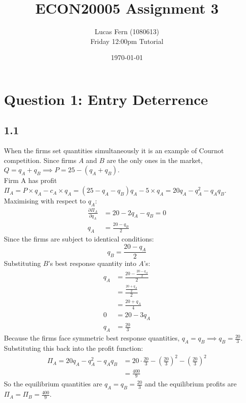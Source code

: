 \documentclass{article}
\title{\vspace{-2cm}ECON20005 Assignment 3}
\date{\today}
\author{Lucas Fern (1080613)\\Friday 12:00pm Tutorial}
\begin{document}
\maketitle
\section*{Question 1: Entry Deterrence}
\subsection*{1.1}
When the firms set quantities simultaneously it is an example of Cournot competition. Since firms $A$ and $B$ are the only ones in the market, $Q = q_{A} + q_{B} \implies P = 25 - (q_{A} + q_{B})$.\\[2mm]
Firm A has profit $\Pi_{A} = P \times q_{A} - c_{A} \times q_{A} = (25 - q_{A} - q_{B}) q_{A} - 5 \times q_{A} = 20q_{A} - q_{A}^{2} - q_{A}q_{B}$.\\[2mm]
Maximising with respect to $q_{A}$:
\begin{align*}
    \frac{\partial \Pi_{A}}{\partial q_{A}} &= 20 - 2q_{A} - q_{B} = 0\\
    q_{A} &= \frac{20 - q_{B}}{2}
\end{align*}
Since the firms are subject to identical conditions:
$$q_{B} = \frac{20 - q_{A}}{2}$$
Substituting $B$'s best response quantity into $A$'s:
\begin{align*}
    q_{A} &= \frac{20 - \frac{20 - q_{A}}{2}}{2}\\
    &= \frac{\frac{20 + q_{A}}{2}}{2}\\
    &= \frac{20 + q_{A}}{4}\\
    0 &= 20 - 3q_{A}\\
    q_{A} &= \frac{20}{3}
\end{align*}
Because the firms face symmetric best response quantities, $q_{A} = q_{B} \implies q_{B} = \frac{20}{3}$.
Substituting this back into the profit function:
\begin{align*}
    \Pi_{A} = 20q_{A} - q_{A}^{2} - q_{A}q_{B} &= 20 \cdot \frac{20}{3} - \left( \frac{20}{3} \right)^{2} - \left( \frac{20}{3} \right)^{2}\\
    &= \frac{400}{9}
\end{align*}
So the equilibrium quantities are $q_{A} = q_{B} = \frac{20}{3}$ and the equilibrium profits are $\Pi_{A} = \Pi_{B} = \frac{400}{9}$.
\end{document}
